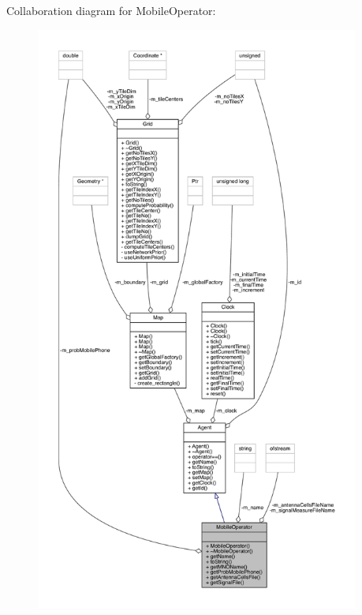 Collaboration diagram for Mobile\+Operator\+:\nopagebreak
\begin{figure}[H]
\begin{center}
\leavevmode
\includegraphics[height=550pt]{class_mobile_operator__coll__graph}
\end{center}
\end{figure}
